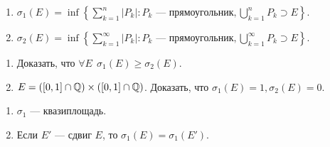 \begin{example}
    \slashn
     \begin{enumerate}
         \item $\sigma_1(E) = \inf \left\{\sum\limits_{k=1}^n |P_k|\!: P_k\text{ --- прямоугольник}, \bigcup\limits_{k=1}^n P_k \supset E\right\}$.
         \item $\sigma_2(E) = \inf \left\{\sum\limits_{k=1}^\infty |P_k|\!: P_k\text{ --- прямоугольник}, \bigcup\limits_{k=1}^\infty P_k  \supset E\right\}$.
    \end{enumerate}
\end{example}
\begin{exerc}
    \slashn
    \begin{enumerate}
        \item Доказать, что $\forall E\ \ \sigma_1(E) \ge \sigma_2(E)$.
        \item $E = \left([0, 1] \cap \mathbb{Q}\right) \times \left([0, 1] \cap \mathbb{Q}\right)$. Доказать, что  $\sigma_1(E) = 1, \sigma_2(E) = 0$.
    \end{enumerate}
\end{exerc}
\begin{theorem}
    \slashn
     \begin{enumerate}
         \item $\sigma_1$ --- квазиплощадь.
         \item Если  $E'$ --- сдвиг  $E$, то  $\sigma_1(E) = \sigma_1(E')$.
     \end{enumerate}
\end{theorem}
